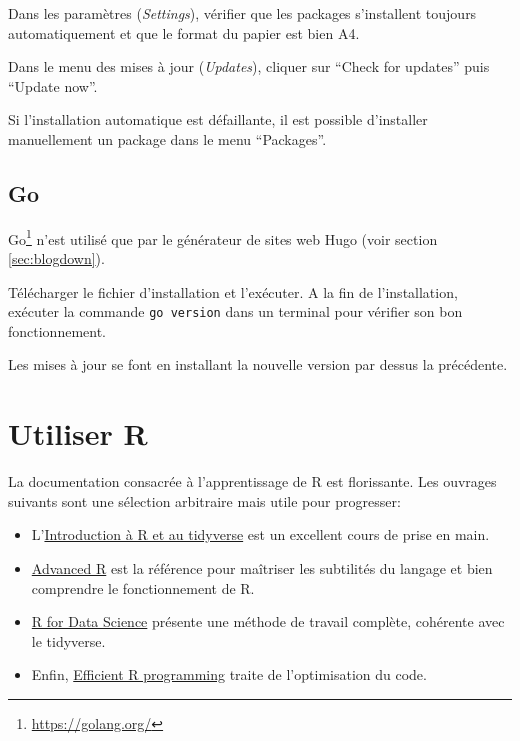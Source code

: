 \documentclass[
  11pt,
  french,
  a4paper,
  extrafontsizes,onecolumn,openright
  ]{memoir}
\providecommand{\tightlist}{%
  \setlength{\itemsep}{0pt}\setlength{\parskip}{0pt}}
\begin{document}
Dans les paramètres (\emph{Settings}), vérifier que les packages s'installent toujours automatiquement et que le format du papier est bien A4.

Dans le menu des mises à jour (\emph{Updates}), cliquer sur ``Check for updates'' puis ``Update now''.

Si l'installation automatique est défaillante, il est possible d'installer manuellement un package dans le menu ``Packages''.

\hypertarget{go}{%
\section{Go}\label{go}}

Go\footnote{\url{https://golang.org/}} n'est utilisé que par le générateur de sites web Hugo (voir section \ref{sec:blogdown}).

Télécharger le fichier d'installation et l'exécuter.
A la fin de l'installation, exécuter la commande \texttt{go\ version} dans un terminal pour vérifier son bon fonctionnement.

Les mises à jour se font en installant la nouvelle version par dessus la précédente.

\hypertarget{chap:utiliseR}{%
\chapter{Utiliser R}\label{chap:utiliseR}}

La documentation consacrée à l'apprentissage de R est florissante.
Les ouvrages suivants sont une sélection arbitraire mais utile pour progresser:

\begin{itemize}
\tightlist
\item
  L'\href{https://juba.github.io/tidyverse/}{Introduction à R et au tidyverse}\autocite{Barnier2020} est un excellent cours de prise en main.
\item
  \href{http://adv-r.had.co.nz/}{Advanced R} \autocite{Wickham2014} est la référence pour maîtriser les subtilités du langage et bien comprendre le fonctionnement de R.
\item
  \href{https://r4ds.had.co.nz/}{R for Data Science} \autocite{Wickham2016} présente une méthode de travail complète, cohérente avec le tidyverse.
\item
  Enfin, \href{https://csgillespie.github.io/efficientR/}{Efficient R programming}\autocite{Gillespie2016} traite de l'optimisation du code.
\end{itemize}
\end{document}

